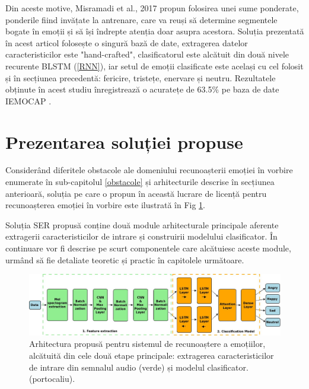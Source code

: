 \documentclass[a4paper,12pt]{book}
\newcounter{Figcount}
\begin{document}
					 Din aceste motive, Misramadi et al., 2017 \cite{misramadi} propun folosirea unei sume ponderate, ponderile fiind invățate la antrenare, care va reuși să determine segmentele bogate în emoții și să își îndrepte atenția doar asupra acestora. 					 
					 Soluția prezentată în acest articol folosește o singură bază de date, extragerea datelor caracteristicilor este "hand-crafted", clasificatorul este alcătuit din două nivele recurente BLSTM (\ref{RNN}), iar setul de emoții clasificate este același cu cel folosit și în secțiunea precedentă: fericire, tristețe, enervare și neutru. Rezultatele obținute în acest studiu înregistrează
					 o acuratețe de 63.5\% pe baza de date IEMOCAP \cite{iemocap}.
					 
				\section{Prezentarea soluției propuse} \label{solutie}
					Considerând diferitele obstacole ale domeniului recunoașterii emoției în vorbire enumerate în sub-capitolul \ref{obstacole} și arhitecturile descrise în secțiunea anterioară, soluția pe care o propun în această lucrare de licență pentru recunoașterea emoției în vorbire este ilustrată în Fig \ref{fig:model}. \par
					Soluția SER propusă conține două module arhitecturale principale aferente extragerii caracteristicilor de intrare și construirii modelului clasificator. În continuare vor fi descrise pe scurt componentele care alcătuiesc aceste module, urmând să fie detaliate teoretic și practic în capitolele următoare. \par
						
					
					\begin{figure}[t]
						\noindent
						\hspace*{-1cm}
						\includegraphics[scale=0.290]{Sistem_Diagram}
						\caption{Arhitectura propusă pentru sistemul de recunoaștere a emoțiilor, alcătuită din cele două etape principale: extragerea caracteristicilor de intrare din semnalul audio (verde) și modelul clasificator. (portocaliu).}
						\label{fig:model}
						
					\end{figure}
				
\end{document}
